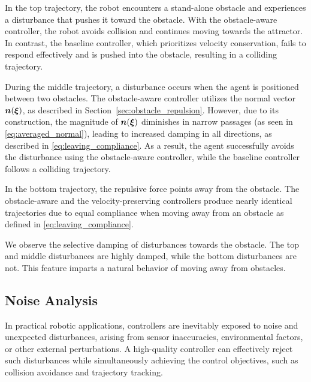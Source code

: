 In the top trajectory, the robot encounters a stand-alone obstacle and experiences a disturbance that pushes it toward the obstacle. With the obstacle-aware controller, the robot avoids collision and continues moving towards the attractor. In contrast, the baseline controller, which prioritizes velocity conservation, fails to respond effectively and is pushed into the obstacle, resulting in a colliding trajectory.

During the middle trajectory, a disturbance occurs when the agent is positioned between two obstacles. The obstacle-aware controller utilizes the normal vector $\boldsymbol{n}(\boldsymbol{\xi})$, as described in Section~\ref{sec:obstacle_repulsion}. However, due to its construction, the magnitude of $\boldsymbol{n}(\boldsymbol{\xi})$ diminishes in narrow passages (as seen in \eqref{eq:averaged_normal}), leading to increased damping in all directions, as described in \eqref{eq:leaving_compliance}. As a result, the agent successfully avoids the disturbance using the obstacle-aware controller, while the baseline controller follows a colliding trajectory.

In the bottom trajectory, the repulsive force points away from the obstacle. The obstacle-aware and the velocity-preserving controllers produce nearly identical trajectories due to equal compliance when moving away from an obstacle as defined in \eqref{eq:leaving_compliance}.

We observe the selective damping of disturbances towards the obstacle. The top and middle disturbances are highly damped, while the bottom disturbances are not. This feature imparts a natural behavior of moving away from obstacles.

\iflong
\subsection{Noise Analysis}
In practical robotic applications, controllers are inevitably exposed to noise and unexpected disturbances, arising from sensor inaccuracies, environmental factors, or other external perturbations. A high-quality controller can effectively reject such disturbances while simultaneously achieving the control objectives, such as collision avoidance and trajectory tracking.

